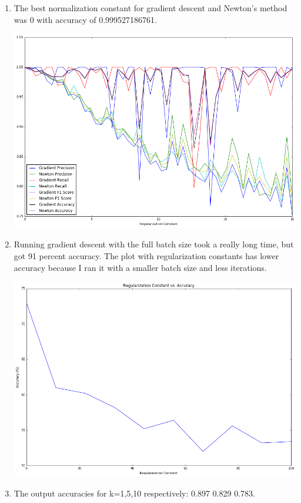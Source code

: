 \documentclass[12pt,letterpaper,fleqn]{hmcpset}
\begin{document}
\begin{enumerate}
     \item
        The best normalization constant for gradient descent and Newton's method was 0 with accuracy of 0.999527186761.
        
        \includegraphics[scale = .5]{logregfinal.png}\\
    \item
        Running gradient descent with the full batch size took a really long time, but got 91 percent accuracy. The plot with regularization constants has lower accuracy because I ran it with a smaller batch size and less iterations.   
        
        \includegraphics[scale = .5]{p2regconst.png}\\
    \item
        The output accuracies for k=1,5,10 respectively: 0.897  0.829 0.783.
        
\end{enumerate}
    
\end{document}
